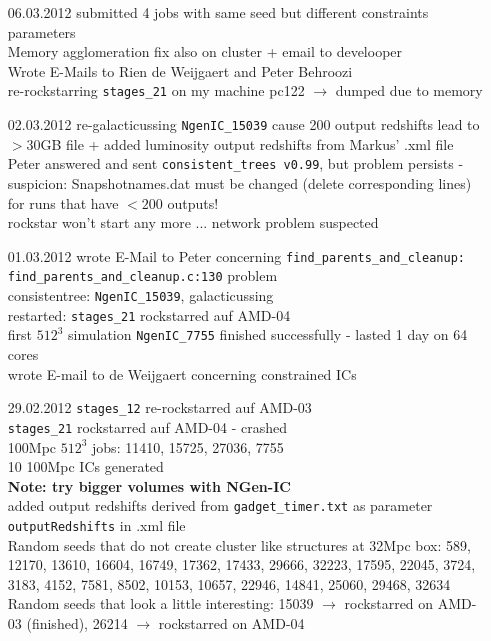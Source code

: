 \begin{itemize}
\item[06.03.2012]
submitted 4 jobs with same seed but different constraints 
parameters \\
Memory agglomeration fix also on cluster + email to develooper \\
Wrote E-Mails to Rien de Weijgaert and Peter Behroozi \\
re-rockstarring \texttt{stages\_21} on my machine pc122  $\rightarrow$ 
dumped due to memory  \\

\item[02.03.2012]
re-galacticussing \texttt{NgenIC\_15039} cause 200 output redshifts 
lead to $>30$GB file + added luminosity output redshifts from 
Markus' .xml file \\
Peter answered and sent \texttt{consistent\_trees v0.99}, but problem 
persists - suspicion: Snapshotnames.dat must be changed (delete 
corresponding lines) for runs that have $<200$ outputs! \\
rockstar won't start any more ... network problem suspected \\


\item[01.03.2012]
wrote E-Mail to Peter concerning 
\texttt{find\_parents\_and\_cleanup: \\ find\_parents\_and\_cleanup.c:130}
problem \\
consistentree: \texttt{NgenIC\_15039}, galacticussing \\
restarted: \texttt{stages\_21} rockstarred auf AMD-04 \\
first $512^3$ simulation \texttt{NgenIC\_7755} finished successfully - lasted 
1 day on 64 cores \\
wrote E-mail to de Weijgaert concerning constrained ICs \\

\item[29.02.2012]
\texttt{stages\_12} re-rockstarred auf AMD-03 \\
\texttt{stages\_21} rockstarred auf AMD-04 - crashed \\
100Mpc $512^3$ jobs: 11410, 15725, 27036, 7755 \\
10 100Mpc ICs generated \\
\textbf{Note: try bigger volumes with NGen-IC} \\ 
added output redshifts derived from \texttt{gadget\_timer.txt} as 
parameter \texttt{outputRedshifts} in .xml file \\ 
Random seeds that do not create cluster like structures at 
32Mpc box: 589, 12170, 13610, 16604, 16749, 17362, 17433, 29666, 32223, 
17595, 22045, 3724, 3183, 4152, 7581, 8502, 10153, 10657, 22946, 14841, 
25060, 29468, 32634
\\
Random seeds that look a little interesting: 15039 $\rightarrow$ rockstarred 
on AMD-03 (finished), 26214 $\rightarrow$ rockstarred on AMD-04



\end{itemize}
